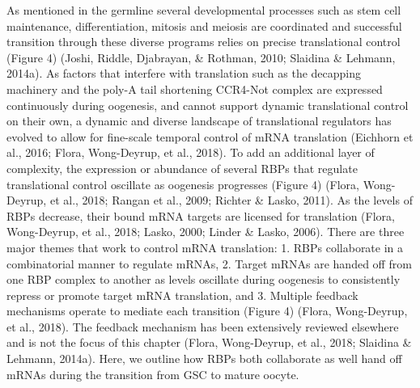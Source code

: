 \documentclass[12pt,oneside]{reedthesis}
\begin{document}
As mentioned in the germline several developmental processes such as
stem cell maintenance, differentiation, mitosis and meiosis are
coordinated and successful transition through these diverse programs
relies on precise translational control (Figure 4) (Joshi, Riddle, Djabrayan, \& Rothman, 2010; Slaidina \& Lehmann, 2014a). As factors that interfere with translation such as
the decapping machinery and the poly-A tail shortening CCR4-Not complex
are expressed continuously during oogenesis, and cannot support dynamic
translational control on their own, a dynamic and diverse landscape of
translational regulators has evolved to allow for fine-scale temporal
control of mRNA translation (Eichhorn et al., 2016; Flora, Wong-Deyrup, et al., 2018). To add an
additional layer of complexity, the expression or abundance of several
RBPs that regulate translational control oscillate as oogenesis
progresses (Figure 4) (Flora, Wong-Deyrup, et al., 2018; Rangan et al., 2009; Richter \& Lasko, 2011). As
the levels of RBPs decrease, their bound mRNA targets are licensed for
translation (Flora, Wong-Deyrup, et al., 2018; Lasko, 2000; Linder \& Lasko, 2006). There are three
major themes that work to control mRNA translation: 1. RBPs collaborate
in a combinatorial manner to regulate mRNAs, 2. Target mRNAs are handed
off from one RBP complex to another as levels oscillate during oogenesis
to consistently repress or promote target mRNA translation, and 3.
Multiple feedback mechanisms operate to mediate each transition (Figure
4) (Flora, Wong-Deyrup, et al., 2018). The feedback mechanism has been extensively
reviewed elsewhere and is not the focus of this chapter (Flora, Wong-Deyrup, et al., 2018; Slaidina \& Lehmann, 2014a). Here, we outline how RBPs both collaborate as well
hand off mRNAs during the transition from GSC to mature oocyte.
\end{document}
